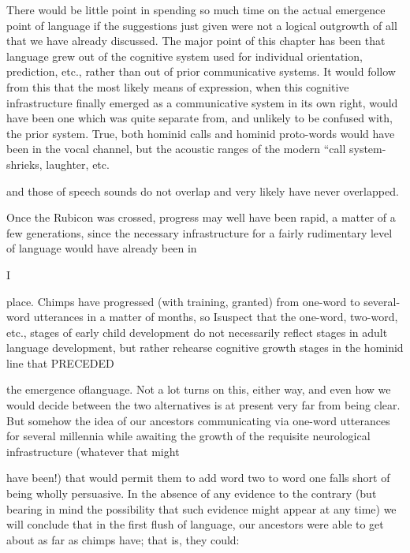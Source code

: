 There would be little point in spending so much time on the actual emergence point of language if the suggestions just given were not a logical outgrowth of all that we have already discussed. The major point of this chapter has been that language grew out of the cognitive system used for individual orientation, prediction, etc., rather than out of prior communicative systems. It would follow from this that the most likely means of expression, when this cognitive infra\-structure finally emerged as a communicative system in its own right, would have been one which was quite separate from, and unlikely to be confused with, the prior system. True, both hominid calls and hominid proto-words would have been in the vocal channel, but the acoustic ranges of the modern ``call system{\textquotedbl}-shrieks, laughter, etc.\-

and those of speech sounds do not overlap and very likely have never overlapped.

Once the Rubicon was crossed, progress may well have been rapid, a matter of a few generations, since the necessary infrastructure for a fairly rudimentary level of language would have already been in

I


place. Chimps have progressed (with training, granted) from one-word to several-word utterances in a matter of months, so Isuspect that the one-word, two-word, etc., stages of early child development do not necessarily reflect stages in adult language development, but rather rehearse cognitive growth stages in the hominid line that PRECEDED

the emergence oflanguage. Not a lot turns on this, either way, and even how we would decide between the two alternatives is at present very far from being clear. But somehow the idea of our ancestors communi\-cating via one-word utterances for several millennia while awaiting the growth of the requisite neurological infrastructure (whatever that might

have been!) that would permit them to add word two to word one falls short of being wholly persuasive. In the absence of any evidence to the contrary (but bearing in mind the possibility that such evidence might appear at any time) we will conclude that in the first flush of language, our ancestors were able to get about as far as chimps have; that is, they could:

